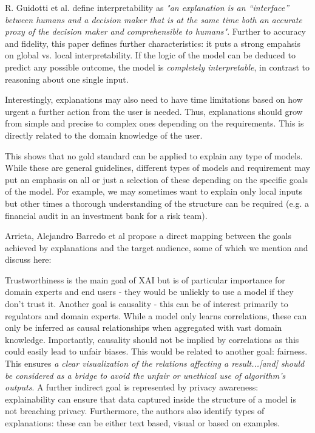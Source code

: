 \documentclass[proposal]{softeng}
\begin{document}
R. Guidotti et al. \cite{guidotti} define interpretability as \textit{"an explanation is an
“interface” between humans and a decision maker that is at the same time both an accurate proxy of the decision maker and comprehensible to humans"}. Further to accuracy and fidelity, this paper defines further characteristics: it puts a strong empahsis on global vs. local interpretability. If the logic of the model can be deduced to predict any possible outcome, the model is \textit{completely interpretable}, in contrast to reasoning about one single input. 

Interestingly, explanations may also need to have time limitations based on how urgent a further action from the user is needed. Thus, explanations should grow from simple and precise to complex ones depending on the requirements. This is directly related to the domain knowledge of the user.

This shows that no gold standard can be applied to explain any type of models. While these are general guidelines, different types of models and requirement may put an emphasis on all or just a selection of these depending on the specific goals of the model. For example, we may sometimes want to explain only local inputs but other times a thorough understanding of the structure can be required (e.g. a financial audit in an investment bank for a risk team). 

Arrieta, Alejandro Barredo et al\cite{BarredoArrietaAlejandro2020EAIX} propose a direct mapping between the goals achieved by explanations and the target audience, some of which we mention and discuss here:

Trustworthiness is the main goal of XAI but is of particular importance for domain experts and end users - they would be unliekly to use a model if they don't trust it. Another goal is causality - this can be of interest primarily to regulators and domain experts. While a model only learns correlations, these can only be inferred as causal relationships when aggregated with vast domain knowledge. Importantly, causality should not be implied by correlations as this could easily lead to unfair biases. This would be related to another goal: fairness. This ensures \textit{a clear visualization of the relations affecting a result...[and] should be considered as a bridge to avoid the unfair or unethical use of algorithm’s outputs}. A further indirect goal is represented by privacy awareness: explainability can ensure that data captured inside the structure of a model is not breaching privacy. Furthermore, the authors also identify types of explanations: these can be either text based, visual or based on examples.
\end{document}
